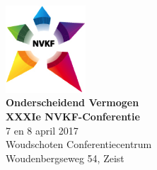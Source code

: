 \documentclass[a4paper,10pt]{report}
\begin{document}
\begin{multicols*}{3}
\noindent
\begin{center}
\includegraphics[width=3cm]{nvkf_logo}\\
{\bfseries Onderscheidend Vermogen}\\ \vspace{0.15cm} 
{\bfseries XXXIe NVKF-Conferentie}\\ \vspace{0.15cm}
{7 en 8 april 2017}\\ \vspace{0.15cm}
{Woudschoten Conferentiecentrum}\\
{Woudenbergseweg 54, Zeist}
\end{center}
\vfill




\end{multicols*}
\end{document}
